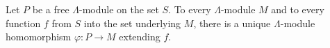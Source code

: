 Let $P$ be a free $\Lambda$-module on the set $S$. To every $\Lambda$-module $M$ and to every function $f$ from $S$ into the set underlying $M$, there is a unique $\Lambda$-module homomorphism $\varphi : P \rightarrow M$ extending $f$.
